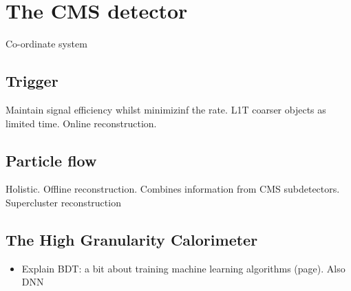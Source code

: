 \chapter{The CMS detector}
\label{chap:cms}

Co-ordinate system

\section{Trigger}\label{sec:trigger}
Maintain signal efficiency whilst minimizinf the rate. L1T coarser objects as limited time. Online reconstruction.

\section{Particle flow}\label{sec:particle_flow}
Holistic.
Offline reconstruction. Combines information from CMS subdetectors. Supercluster reconstruction


\section{The High Granularity Calorimeter}
\begin{itemize}
    \item Explain BDT: a bit about training machine learning algorithms (page). Also DNN
\end{itemize}
